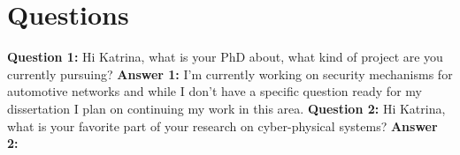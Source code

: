 \section{Questions}
\textbf{Question 1:}
Hi Katrina, what is your PhD about, what kind of project are you currently pursuing?
\newline
\textbf{Answer 1:} I'm currently working on security mechanisms for automotive networks and while I don't have a specific question ready for my dissertation I plan on continuing my work in this area.  
\newline
\textbf{Question 2:}
Hi Katrina, what is your favorite part of your research on cyber-physical systems?
\newline
\textbf{Answer 2:}
\newline